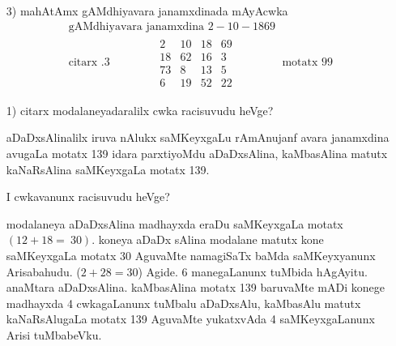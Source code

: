 \begin{enumerate}[{\rm I}]
{\rm 4} neV vagaRda mAyAcwkada racane.
$A, B, C, D$ matutx $P, Q, R, S$ beVre beVre dhana pUNaRMkagaLAgirali. Aga keLage koTiTxruva mAyAcwkavu meVlina akaSxragaLige yAvudeV dhana pUNARMka bele koTaTxrU sari hoVguva pUNARMka mAyAcwkavAgirutatxde.
$$
\begin{matrix}
A+P & D+S & C+Q & B+R\\
C+R & B+Q & A+S & D+P\\
B+S & C+P & D+R & A+Q\\
D+Q & A+R & B+P & C+S
\end{matrix}
$$

\item[{\rm 3)}] mahAtAmx gAMdhiyavara janamxdinada mAyAcwka
\begin{gather*}
\text{gAMdhiyavara janamxdina }  2-10-1869\\
\text{citarx~.} 3 \qquad \qquad 
\begin{matrix}
2 & 10 & 18 & 69\\
18 & 62 & 16 & 3\\
73 & 8 & 13 & 5\\
6 & 19 & 52 & 22
\end{matrix} \qquad \qquad 
\text{motatx } 99
\end{gather*}

\item[{\rm 1)}] citarx modalaneyadaralilx cwka racisuvudu heVge?

 aDaDxsAlinalilx iruva nAlukx saMKeyxgaLu rAmAnujanf avara janamxdina avugaLa motatx {\rm 139} idara parxtiyoMdu aDaDxsAlina, kaMbasAlina matutx kaNaRsAlina saMKeyxgaLa motatx {\rm 139.} 
 
I cwkavanunx racisuvudu heVge? 

modalaneya aDaDxsAlina madhayxda eraDu saMKeyxgaLa motatx $(12+18=~30)$. koneya aDaDx sAlina modalane matutx kone saMKeyxgaLa motatx {\rm 30} AguvaMte namagiSaTx baMda saMKeyxyanunx Arisabahudu. ($2+28=30$) Agide. {\rm 6} manegaLanunx tuMbida hAgAyitu. anaMtara aDaDxsAlina. kaMbasAlina motatx {\rm 139} baruvaMte mADi konege madhayxda {\rm 4} cwkagaLanunx tuMbalu aDaDxsAlu, kaMbasAlu matutx kaNaRsAlugaLa motatx {\rm 139} AguvaMte yukatxvAda {\rm 4} saMKeyxgaLanunx Arisi tuMbabeVku.
\end{enumerate}

